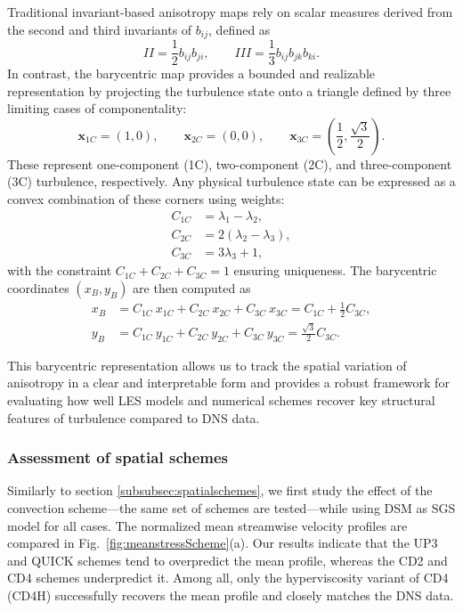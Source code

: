 \documentclass[final,3p]{elsarticle}
\begin{document}
Traditional invariant-based anisotropy maps \cite{lumley1977return,choi2001return,banerjee2007presentation,emory2014visualizing} rely on scalar measures derived from the second and third invariants of \( b_{ij} \), defined as
\[
II = \frac{1}{2} b_{ij} b_{ji}, \qquad III = \frac{1}{3} b_{ij} b_{jk} b_{ki}.
\]
%
In contrast, the barycentric map provides a bounded and realizable representation by projecting the turbulence state onto a triangle defined by three limiting cases of componentality:
\[
\mathbf{x}_{1C} = (1, 0), \qquad \mathbf{x}_{2C} = (0, 0), \qquad \mathbf{x}_{3C} = \left( \frac{1}{2}, \frac{\sqrt{3}}{2} \right).
\]
These represent one-component (1C), two-component (2C), and three-component (3C) turbulence, respectively. Any physical turbulence state can be expressed as a convex combination of these corners using weights:
\begin{align}
	C_{1C} &= \lambda_1 - \lambda_2, \\
	C_{2C} &= 2(\lambda_2 - \lambda_3), \\
	C_{3C} &= 3\lambda_3 + 1,
\end{align}
with the constraint \( C_{1C} + C_{2C} + C_{3C} = 1 \) ensuring uniqueness. The barycentric coordinates \( (x_B, y_B) \) are then computed as
\begin{align}
	x_B &= C_{1C} ~ x_{1C} + C_{2C} ~ x_{2C} + C_{3C} ~ x_{3C} = C_{1C} + \frac{1}{2} C_{3C}, \\
	y_B &= C_{1C} ~ y_{1C} + C_{2C} ~ y_{2C} + C_{3C} ~ y_{3C} = \frac{\sqrt{3}}{2} C_{3C}.
\end{align}

This barycentric representation allows us to track the spatial variation of anisotropy in a clear and interpretable form and provides a robust framework for evaluating how well LES models and numerical schemes recover key structural features of turbulence compared to DNS data.

\subsubsection{Assessment of spatial schemes}
\label{subsubsection:spatialSchemesTCF}
Similarly to section \ref{subsubsec:spatialschemes}, we first study the effect of the convection scheme---the same set of schemes are tested---while using DSM as SGS model for all cases. The normalized mean streamwise velocity profiles are compared in Fig.~\ref{fig:meanstressScheme}(a). Our results indicate that the UP3 and QUICK schemes tend to overpredict the mean profile, whereas the CD2 and CD4 schemes underpredict it. Among all, only the hyperviscosity variant of CD4 (CD4H) successfully recovers the mean profile and closely matches the DNS data.
\end{document}

